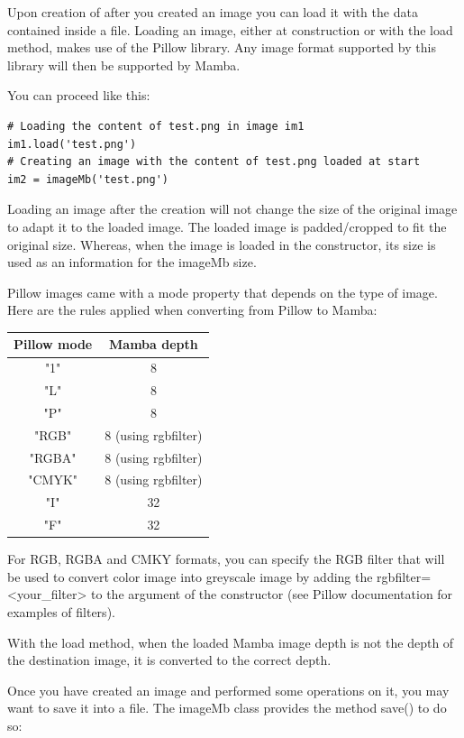 \documentclass[a4paper,10pt,oneside]{article}
\begin{document}
Upon creation of after you created an image you can load it with the data
contained inside a file. Loading an image, either at construction or
with the load method, makes use of the Pillow library. Any image format supported
by this library will then be supported by Mamba.

You can proceed like this:

\lstset{language=Python}
\begin{lstlisting}
# Loading the content of test.png in image im1
im1.load('test.png')
# Creating an image with the content of test.png loaded at start
im2 = imageMb('test.png')
\end{lstlisting}

Loading an image after the creation will not change the size of the original 
image to adapt it to the loaded image. The loaded image is padded/cropped to fit
the original size. Whereas, when the image is loaded in the constructor, its size
is used as an information for the imageMb size.

Pillow images came with a mode property that depends on the type of image.
Here are the rules applied when converting from Pillow to Mamba:

\begin{center}
\begin{tabular}{|c|c|}
  \hline
  Pillow mode & Mamba depth \\
  \hline
  "1" & 8\\
  "L" & 8\\
  "P" & 8\\
  "RGB" & 8 (using rgbfilter)\\
  "RGBA" & 8 (using rgbfilter)\\
  "CMYK" & 8 (using rgbfilter)\\
  "I" & 32\\ 
  "F" & 32\\
  \hline
\end{tabular}
\end{center}

For RGB, RGBA and CMKY formats, you can specify the RGB filter that will be
used to convert color image into greyscale image by adding the
rgbfilter=<your\_filter> to the argument of the constructor (see Pillow
documentation for examples of filters).

With the load method, when the loaded Mamba image depth is not the depth
of the destination image, it is converted to the correct depth.

Once you have created an image and performed some operations on it, you may want 
to save it into a file. The imageMb class provides the method save() to do so:
\end{document}

